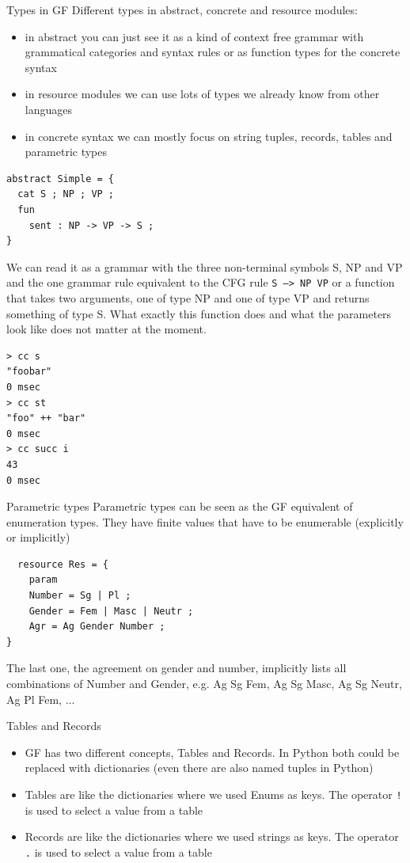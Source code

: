 \documentclass{beamer}
\begin{document}
\begin{frame}{Types in GF}
  Different types in abstract, concrete and resource modules:
  \begin{itemize}
  \item in abstract you can just see it as a kind of context free grammar with grammatical categories and syntax rules or as function types for the concrete syntax
  \item in resource modules we can use lots of types we already know from other languages
  \item in concrete syntax we can mostly focus on string tuples, records, tables and parametric types
  \end{itemize}
\end{frame}
\begin{frame}[fragile]
  \begin{lstlisting}
abstract Simple = {
  cat S ; NP ; VP ;
  fun
    sent : NP -> VP -> S ;
}
  \end{lstlisting}
  We can read it as a grammar with the three non-terminal symbols S, NP and VP and the one grammar rule equivalent to the CFG rule \texttt{S --> NP VP}
  or a function that takes two arguments, one of type NP and one of type VP and returns something of type S. What exactly this function does and what the parameters look like does not matter at the moment.
\end{frame}
\begin{frame}[fragile]
  
\begin{verbatim}
> cc s
"foobar"
0 msec
> cc st
"foo" ++ "bar"
0 msec
> cc succ i
43
0 msec
\end{verbatim}
\end{frame}

\begin{frame}[fragile]{Parametric types}
  Parametric types can be seen as the GF equivalent of enumeration types. They have finite values that have to be enumerable (explicitly or implicitly)
\begin{lstlisting}
  resource Res = {
    param
    Number = Sg | Pl ;
    Gender = Fem | Masc | Neutr ;
    Agr = Ag Gender Number ;
}
\end{lstlisting}
The last one, the agreement on gender and number, implicitly lists all combinations of Number and Gender, e.g. Ag Sg Fem, Ag Sg Masc, Ag Sg Neutr, Ag Pl Fem, ...
\end{frame}

\begin{frame}{Tables and Records}
  \begin{itemize}
  \item GF has two different concepts, Tables and Records. In Python both could be replaced with dictionaries (even there are also named tuples in Python)
  \item Tables are like the dictionaries where we used Enums as keys. The operator \texttt{!} is used to select a value from a table
  \item Records are like the dictionaries where we used strings as keys. The operator \texttt{.} is used to select a value from a table 
  \end{itemize}
\end{frame}
\end{document}
